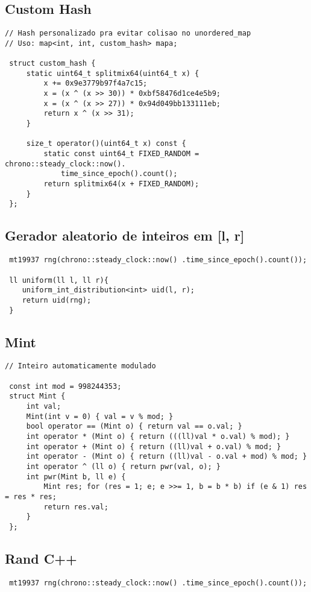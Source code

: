 \documentclass[11pt, a4paper, twoside]{article}
\begin{document}
\subsection{Custom Hash}
\begin{lstlisting}
// Hash personalizado pra evitar colisao no unordered_map
// Uso: map<int, int, custom_hash> mapa;

 struct custom_hash {
     static uint64_t splitmix64(uint64_t x) {
         x += 0x9e3779b97f4a7c15;
         x = (x ^ (x >> 30)) * 0xbf58476d1ce4e5b9;
         x = (x ^ (x >> 27)) * 0x94d049bb133111eb;
         return x ^ (x >> 31);
     }
  
     size_t operator()(uint64_t x) const {
         static const uint64_t FIXED_RANDOM = chrono::steady_clock::now().
             time_since_epoch().count();
         return splitmix64(x + FIXED_RANDOM);
     }
 };
\end{lstlisting}

\subsection{Gerador aleatorio de inteiros em [l, r]}
\begin{lstlisting}
 mt19937 rng(chrono::steady_clock::now() .time_since_epoch().count());
 
 ll uniform(ll l, ll r){
 	uniform_int_distribution<int> uid(l, r);
 	return uid(rng);
 }
\end{lstlisting}

\subsection{Mint}
\begin{lstlisting}
// Inteiro automaticamente modulado

 const int mod = 998244353;
 struct Mint {
     int val;
     Mint(int v = 0) { val = v % mod; }
     bool operator == (Mint o) { return val == o.val; }
     int operator * (Mint o) { return (((ll)val * o.val) % mod); }
     int operator + (Mint o) { return ((ll)val + o.val) % mod; }
     int operator - (Mint o) { return ((ll)val - o.val + mod) % mod; }
     int operator ^ (ll o) { return pwr(val, o); }
     int pwr(Mint b, ll e) {
         Mint res; for (res = 1; e; e >>= 1, b = b * b) if (e & 1) res = res * res;
         return res.val;
     }
 };
\end{lstlisting}

\subsection{Rand C++}
\begin{lstlisting}
 mt19937 rng(chrono::steady_clock::now() .time_since_epoch().count());
\end{lstlisting}
\end{document}
